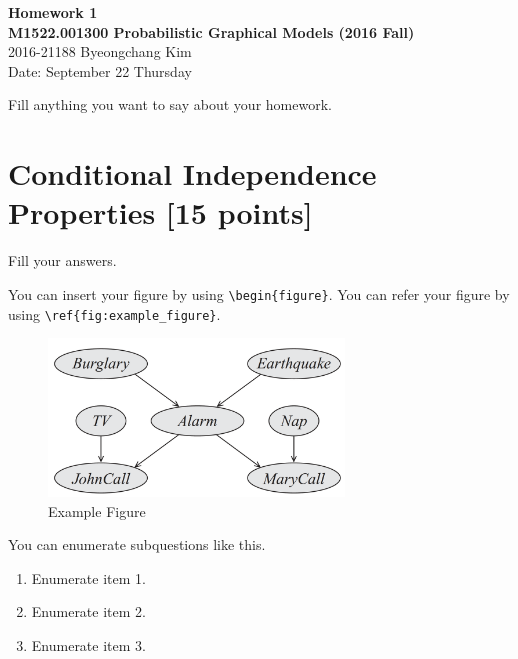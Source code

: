 \documentclass[12pt,a4paper]{article}
\begin{document}
\begin{center}
    {\bf\large Homework 1} \\
    {\bf\large M1522.001300 Probabilistic Graphical Models (2016 Fall)} \\
    2016-21188 Byeongchang Kim \\
    Date: September 22 Thursday
\end{center}

Fill anything you want to say about your homework.

\section{Conditional Independence Properties [15 points]}

Fill your answers.

You can insert your figure by using \verb|\begin{figure}|.
You can refer your figure by using \verb|\ref{fig:example_figure}|.

\begin{figure}[!h]
    \begin{center}
        \includegraphics[width=0.7\textwidth]{assets/fig1.png}
        \caption{Example Figure}
        \label{fig:example_figure}
    \end{center}
\end{figure}

You can enumerate subquestions like this.

\begin{enumerate}
    \item Enumerate item 1.
    \item Enumerate item 2.
    \item Enumerate item 3.
\end{enumerate}
\end{document}

